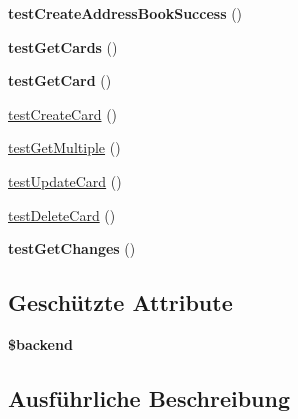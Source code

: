 \begin{DoxyCompactItemize}
{\bfseries test\+Create\+Address\+Book\+Success} ()
\item 
\mbox{\label{class_sabre_1_1_card_d_a_v_1_1_backend_1_1_abstract_p_d_o_test_a56f9bf286089a04b6966377af5f63b27}} 
{\bfseries test\+Get\+Cards} ()
\item 
\mbox{\label{class_sabre_1_1_card_d_a_v_1_1_backend_1_1_abstract_p_d_o_test_aaa00811cb1e5484c66eeefd0d66c0139}} 
{\bfseries test\+Get\+Card} ()
\item 
\mbox{\hyperlink{class_sabre_1_1_card_d_a_v_1_1_backend_1_1_abstract_p_d_o_test_a89d33d8d1ffd69b85e4e6efd24d9f27c}{test\+Create\+Card}} ()
\item 
\mbox{\hyperlink{class_sabre_1_1_card_d_a_v_1_1_backend_1_1_abstract_p_d_o_test_a53ba917a3f5e2b94615092c51323eb0e}{test\+Get\+Multiple}} ()
\item 
\mbox{\hyperlink{class_sabre_1_1_card_d_a_v_1_1_backend_1_1_abstract_p_d_o_test_aacd2437dddbce6857203e647b8c11641}{test\+Update\+Card}} ()
\item 
\mbox{\hyperlink{class_sabre_1_1_card_d_a_v_1_1_backend_1_1_abstract_p_d_o_test_ac35869981414a247c01088c894824f11}{test\+Delete\+Card}} ()
\item 
\mbox{\label{class_sabre_1_1_card_d_a_v_1_1_backend_1_1_abstract_p_d_o_test_a517c88bbcc4abe6533c1cdf31a7b251a}} 
{\bfseries test\+Get\+Changes} ()
\end{DoxyCompactItemize}
\subsection*{Geschützte Attribute}
\begin{DoxyCompactItemize}
\item 
\mbox{\label{class_sabre_1_1_card_d_a_v_1_1_backend_1_1_abstract_p_d_o_test_a2dbb02a64562c83effe4e411c9c8112a}} 
{\bfseries \$backend}
\end{DoxyCompactItemize}


\subsection{Ausführliche Beschreibung}


